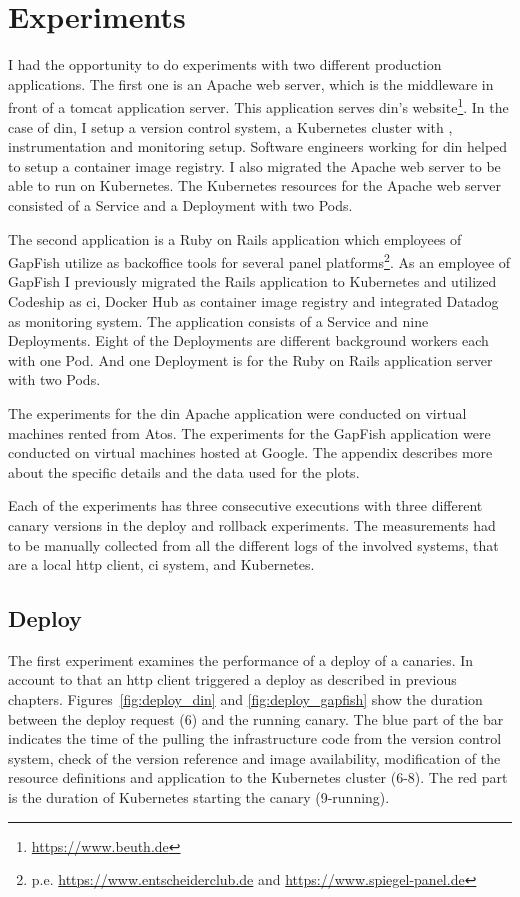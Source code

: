 \section{Experiments}

I had the opportunity to do experiments with two different production applications. The
first one is an Apache web server, which is the middleware in front of a tomcat
application server. This application serves \gls{din}'s
website\footnote{\url{https://www.beuth.de}}. In the case of \gls{din}, I setup a version
control system, a Kubernetes cluster with \deployer, instrumentation and monitoring
setup. Software engineers working for \gls{din} helped to setup a container image
registry. I also migrated the Apache web server to be able to run on Kubernetes. The
Kubernetes resources for the Apache web server consisted of a Service and a Deployment
with two Pods.

The second application is a Ruby on Rails application which employees of GapFish utilize
as backoffice tools for several panel
platforms\footnote{p.e. \url{https://www.entscheiderclub.de} and
  \url{https://www.spiegel-panel.de}}. As an employee of GapFish I previously migrated the
Rails application to Kubernetes and utilized Codeship as \gls{ci}, Docker Hub as container
image registry and integrated Datadog as monitoring system. The application consists of a
Service and nine Deployments. Eight of the Deployments are different background workers
each with one Pod. And one Deployment is for the Ruby on Rails application server with two
Pods.

The experiments for the \gls{din} Apache application were conducted on virtual machines
rented from Atos. The experiments for the GapFish application were conducted on virtual
machines hosted at Google. The appendix describes more about the specific details and the
data used for the plots.

Each of the experiments has three consecutive executions with three different canary
versions in the deploy and rollback experiments. The measurements had to be manually
collected from all the different logs of the involved systems, that are a local http
client, \gls{ci} system, \deployer and Kubernetes.

\subsection{Deploy}

The first experiment examines the performance of a deploy of a canaries. In account to
that an http client triggered a deploy as described in previous
chapters. Figures~\ref{fig:deploy_din} and \ref{fig:deploy_gapfish} show the duration
between the deploy request (6) and the running canary. The blue part of the bar indicates
the time of the \deployer pulling the infrastructure code from the version control system,
check of the version reference and image availability, modification of the resource
definitions and application to the Kubernetes cluster (6-8). The red part is the duration
of Kubernetes starting the canary (9-running).

